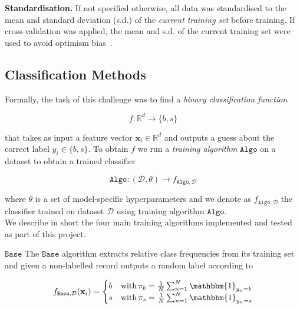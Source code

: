 \documentclass[10pt,conference,compsocconf]{IEEEtran}
\newcommand{\parabf}[1]{\vspace{1mm}\noindent\textbf{#1}}
\newcommand{\Data}{\mathcal{D}}
\newcommand{\features}{\mathbf{x}_i}
\newcommand{\target}{y_i}
\newcommand{\targetset}{\{ b, s \}}
\newcommand{\classifier}[2]{f_{#1, #2}}
\newcommand{\Train}{\mathtt{Algo}}
\newcommand{\Baseline}{\mathtt{Base}}
\begin{document}
\parabf{Standardisation.} If not specified otherwise, all data was standardised to the mean and standard deviation (s.d.) of the \emph{current training set} before training. If cross-validation was applied, the mean and s.d. of the current training set were used to avoid optimism bias~\cite{Domingos2012}. 

\vspace*{-3.mm}
\subsection{Classification Methods}
Formally, the task of this challenge was to find a \emph{binary classification function}

\vspace*{-4mm}
\begin{equation}
	f: \mathbb{R}^d \rightarrow \targetset
\end{equation}

that takes as input a feature vector $\features \in \mathbb{R}^d$ and outputs a guess about the correct label $\target \in \targetset$. To obtain $f$ we run a \emph{training algorithm} $\Train$ on a dataset to obtain a trained classifier

\vspace*{-4mm}
\begin{equation}
	\Train: (\Data, \theta) \rightarrow \classifier{\Train}{\Data}
\end{equation}

where $\theta$ is a set of model-specific hyperparameters and we denote as $\classifier{\Train}{\Data}$ the classifier trained on dataset $\Data$ using training algorithm $\Train$.\\

We describe in short the four main training algorithms implemented and tested as part of this project.

\parabf{$\Baseline$} The $\Baseline$ algorithm extracts relative class frequencies from its training set and given a non-labelled record outputs a random label according to

\vspace*{-4mm}
\begin{equation}
	\classifier{\Baseline}{\Data}(\features) = 
	\begin{cases}
	b &\mbox{with}\,  \pi_b = \frac{1}{N} \sum_{n=1}^N{\mathbbm{1}_{y_n = b}}\\
	s &\mbox{with}\,  \pi_s = \frac{1}{N} \sum_{n=1}^N{\mathbbm{1}_{y_n = s}}
	\end{cases}
\end{equation}
\end{document}
